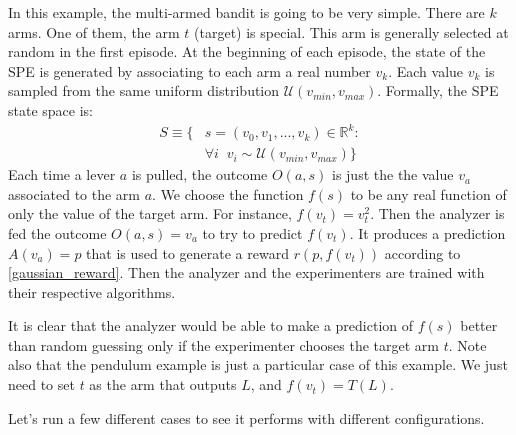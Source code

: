 \documentclass[11pt,a4paper,twoside]{report}
\newcommand{\+}{\textnormal{+} }
\theoremstyle{definition}
\numberwithin{equation}{chapter}
\begin{document}
  In this example, the multi-armed bandit is going to be very simple. There are
  $k$ arms. One of them, the arm $t$ (target) is special. This arm is generally
  selected at random in the first episode. At the beginning of each episode, the
  state of the SPE is generated by associating to each arm a real number $v_k$.
  Each value $v_k$ is sampled from the same uniform distribution
  $\mathcal{U}(v_{min},v_{max})$. Formally, the SPE state space is:
  \begin{align}
    S\equiv\{&s=(v_0, v_1,...,v_k) \in \mathbb{R}^k: \\
    & \forall i \; \; v_i \sim \mathcal{U}(v_{min},v_{max})
    \}
  \end{align}
  Each time a lever $a$ is pulled, the outcome $O(a,s)$ is just the the value
  $v_a$ associated to the arm $a$. We choose the function $f(s)$ to be any real
  function of only the value of the target arm. For instance, $f(v_t)=v_t^2$.
  Then the analyzer is fed the outcome $O(a,s)=v_a$ to try to predict $f(v_t)$.
  It produces a prediction $A(v_a)=p$ that is used to generate a reward
  $r(p,f(v_t))$ according to \eqref{gaussian_reward}. Then the analyzer and the
  experimenters are trained with their respective algorithms.

  \par It is clear that the analyzer would be able to make a prediction of
  $f(s)$ better than random guessing only if the experimenter chooses the target
  arm $t$. Note also that the pendulum example is just a particular case of this
  example. We just need to set $t$ as the arm that outputs $L$, and
  $f(v_t)=T(L)$.

  Let's run a few different cases to see it performs with different
  configurations.
\end{document}
